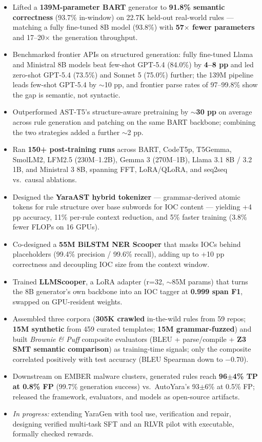 \documentclass[letterpaper,11pt]{article}
\begin{document}
        \begin{itemize}
          \item \small Lifted a \textbf{139M-parameter BART} generator to \textbf{91.8\% semantic correctness} (93.7\% in-window) on 22.7K held-out real-world rules --- matching a fully fine-tuned 8B model (93.8\%) with \textbf{57$\times$ fewer parameters} and 17--20$\times$ the generation throughput.
          \item \small Benchmarked frontier APIs on structured generation: fully fine-tuned Llama and Ministral 8B models beat few-shot GPT-5.4 (84.0\%) by \textbf{4--8 pp} and led zero-shot GPT-5.4 (73.5\%) and Sonnet 5 (75.0\%) further; the 139M pipeline leads few-shot GPT-5.4 by $\sim$10 pp, and frontier parse rates of 97--99.8\% show the gap is semantic, not syntactic.
          \item \small Outperformed AST-T5's structure-aware pretraining by $\sim$\textbf{30 pp} on average across rule generation and patching on the same BART backbone; combining the two strategies added a further $\sim$2 pp.
          \item \small Ran \textbf{150+ post-training runs} across BART, CodeT5p, T5Gemma, SmolLM2, LFM2.5 (230M--1.2B), Gemma 3 (270M--1B), Llama 3.1 8B / 3.2 1B, and Ministral 3 8B, spanning FFT, LoRA/QLoRA, and seq2seq vs.\ causal ablations.
          \item \small Designed the \textbf{YaraAST hybrid tokenizer} --- grammar-derived atomic tokens for rule structure over base subwords for IOC content --- yielding +4 pp accuracy, 11\% per-rule context reduction, and 5\% faster training (3.8\% fewer FLOPs on 16 GPUs).
          \item \small Co-designed a \textbf{55M BiLSTM NER Scooper} that masks IOCs behind placeholders (99.4\% precision / 99.6\% recall), adding up to +10 pp correctness and decoupling IOC size from the context window.
          \item \small Trained \textbf{LLMScooper}, a LoRA adapter (r=32, $\sim$85M params) that turns the 8B generator's own backbone into an IOC tagger at \textbf{0.999 span F1}, swapped on GPU-resident weights.
          \item \small Assembled three corpora (\textbf{305K crawled} in-the-wild rules from 59 repos; \textbf{15M synthetic} from 459 curated templates; \textbf{15M grammar-fuzzed}) and built \textit{Brownie \& Puff} composite evaluators (BLEU + parse/compile + \textbf{Z3 SMT semantic comparison}) as training-time signals; only the composite correlated positively with test accuracy (BLEU Spearman down to $-$0.70).
          \item \small Downstream on EMBER malware clusters, generated rules reach \textbf{96$\pm$4\% TP at 0.8\% FP} (99.7\% generation success) vs.\ AutoYara's 93$\pm$6\% at 0.5\% FP; released the framework, evaluators, and models as open-source artifacts.
          \item \small \textit{In progress:} extending YaraGen with tool use, verification and repair, designing verified multi-task SFT and an RLVR pilot with executable, formally checked rewards.
        \end{itemize}
\end{document}
